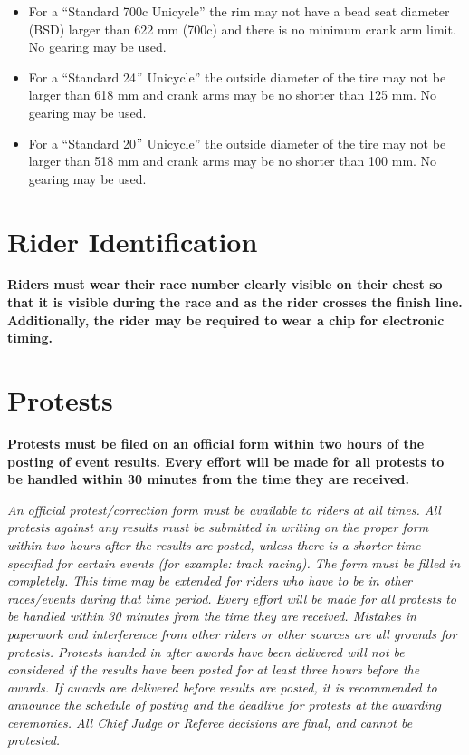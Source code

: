 \begin{itemize}
\item For a ``Standard 700c Unicycle'' the rim may not have a bead seat diameter (BSD) larger than 622 mm (700c) and there is no minimum crank arm limit.
No gearing may be used.
\item For a ``Standard 24$"$ Unicycle'' the outside diameter of the tire may not be larger than 618 mm and crank arms may be no shorter than 125 mm.
No gearing may be used.
\item For a ``Standard 20$"$ Unicycle'' the outside diameter of the tire may not be larger than 518 mm and crank arms may be no shorter than 100 mm.
No gearing may be used.
\end{itemize}

\section{Rider Identification}

\textbf{Riders must wear their race number clearly visible on their chest so that it is visible during the race and as the rider crosses the finish line.  Additionally, the rider may be required to wear a chip for electronic timing.}

\section{Protests}

\textbf{Protests must be filed on an official form within two hours of the posting of event results. Every effort will be made for all protests to be handled within 30 minutes from the time they are received.}

\textit{An official protest/correction form must be available to riders at all times. All
protests against any results must be submitted in writing on the proper form within
two hours after the results are posted, unless there is a shorter time specified for certain
events (for example: track racing). The form must be filled in completely. This time
may be extended for riders who have to be in other races/events during that time period.
Every effort will be made for all protests to be handled within 30 minutes from the time
they are received. Mistakes in paperwork and interference from other riders or other
sources are all grounds for protests. Protests handed in after awards have been delivered
will not be considered if the results have been posted for at least three hours before the
awards. If awards are delivered before results are posted, it is recommended to announce
the schedule of posting and the deadline for protests at the awarding ceremonies. All
Chief Judge or Referee decisions are final, and cannot be protested.}

